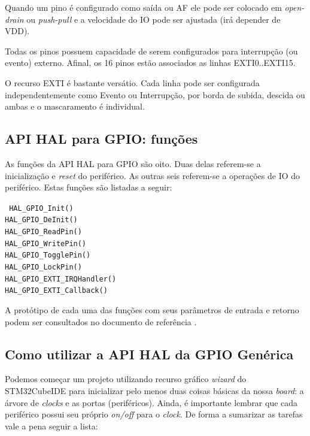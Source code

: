 \documentclass[12pt,journal,compsoc]{IEEEtran}
\begin{document}
Quando um pino é configurado como saída ou AF ele pode ser colocado em \emph{open-drain} ou \emph{push-pull} e a velocidade do IO pode ser ajustada (irá depender de VDD). 

Todas os pinos possuem capacidade de serem configurados para interrupção (ou evento) externo. Afinal, os 16 pinos estão associados as linhas EXTI0..EXTI15.

O recurso EXTI é bastante versátio. Cada linha pode ser configurada independentemente como Evento ou Interrupção, por borda de subida,  descida ou ambas e o mascaramento é individual.

\subsection{API HAL para GPIO: funções}

As funções da API HAL para GPIO são oito. Duas delas referem-se a inicialização e \emph{reset} do periférico. As outras seis referem-se a operações de IO do periférico. Estas funções são listadas a seguir:

\begin{flushleft}
{\texttt{
HAL\_GPIO\_Init() \\
HAL\_GPIO\_DeInit() \\
HAL\_GPIO\_ReadPin() \\
HAL\_GPIO\_WritePin() \\
HAL\_GPIO\_TogglePin() \\
HAL\_GPIO\_LockPin() \\
HAL\_GPIO\_EXTI\_IRQHandler() \\
HAL\_GPIO\_EXTI\_Callback() }} 
\end{flushleft} 

A protótipo de cada uma das funções com seus parâmetros de entrada e retorno podem ser consultados no documento de referência \cite{st_um1725}. 

\subsection{Como utilizar a API HAL da GPIO Genérica}

Podemos começar um projeto utilizando recurso gráfico \emph{wizard} do STM32CubeIDE para inicializar pelo menos duas coisas básicas da nossa \emph{board}: a árvore  de \emph{clocks} e as portas (periféricos). Ainda, é importante lembrar que cada periférico possui seu próprio \emph{on/off} para o \emph{clock}. De forma a sumarizar as tarefas vale a pena seguir a lista:
\end{document}
